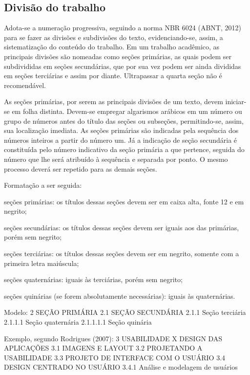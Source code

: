 \documentclass[a4paper,12pt]{article}  %
\begin{document}
\begin{ElementosTextuais}
\begin{Desenvolvimento}
\section{Divisão do trabalho}
Adota-se a numeração progressiva, seguindo a norma NBR 6024 (ABNT, 2012) para se fazer as divisões e subdivisões do texto, evidenciando-se, assim, a sistematização do conteúdo do trabalho. Em um trabalho acadêmico, as principais divisões são nomeadas como seções primárias, as quais podem ser subdivididas em seções secundárias, que por sua vez podem ser ainda divididas em seções terciárias e assim por diante. Ultrapassar a quarta seção não é recomendável.

As seções primárias, por serem as principais divisões de um texto, devem iniciar-se em folha distinta. Devem-se empregar algarismos arábicos em um número ou grupo de números antes do título das seções ou subseções, permitindo-se, assim, sua localização imediata. As seções primárias são indicadas pela sequência dos números inteiros a partir do número um. Já a indicação de seção secundária é constituída pelo número indicativo da seção primária a que pertence, seguida do número que lhe será atribuído à sequência e separada por ponto. O mesmo processo deverá ser repetido para as demais seções.

Formatação a ser seguida:

\begin{alphaitemize}
  \item seções primárias: os títulos dessas seções devem ser em caixa alta, fonte 12 e em negrito;
  \item seções secundárias: os títulos dessas seções devem ser iguais aos das primárias, porém sem negrito;
  \item seções terciárias: os títulos dessas seções devem ser em negrito, somente com a primeira letra maiúscula;
  \item seções quaternárias: iguais às terciárias, porém sem negrito;
  \item seções quinárias (se forem absolutamente necessárias): iguais às quaternárias.
\end{alphaitemize}

Modelo:
2 SEÇÃO PRIMÁRIA
2.1 SEÇÃO SECUNDÁRIA
2.1.1 Seção terciária
2.1.1.1 Seção quaternária
2.1.1.1.1 Seção quinária

Exemplo, segundo Rodrigues (2007):
3 USABILIDADE X DESIGN DAS APLICAÇÕES
3.1 IMAGENS E LAYOUT
3.2 PROJETANDO A USABILIDADE
3.3 PROJETO DE INTERFACE COM O USUÁRIO
3.4 DESIGN CENTRADO NO USUÁRIO
3.4.1 Análise e modelagem de usuários


\end{Desenvolvimento}
\end{ElementosTextuais}
\end{document}
